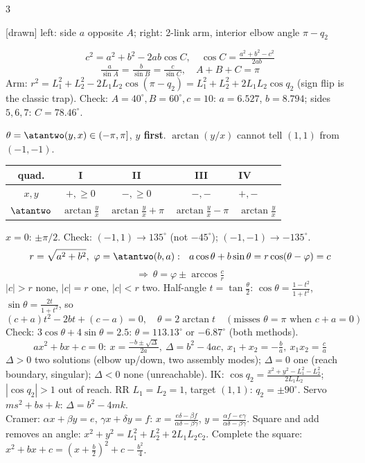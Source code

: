 \begin{multicols}{3}
\begin{fbx}
\par
{\sffamily\scriptsize\color{slate}[drawn] left: side $a$ opposite $A$; right: 2-link arm, interior elbow angle $\pi-q_2$}\par
\raggedright
\[c^2=a^2+b^2-2ab\cos C,\quad\cos C=\tfrac{a^2+b^2-c^2}{2ab}\]
\[\tfrac a{\sin A}=\tfrac b{\sin B}=\tfrac c{\sin C},\quad A+B+C=\pi\]
Arm: $r^2=L_1^2+L_2^2-2L_1L_2\cos(\pi-q_2)=L_1^2+L_2^2+2L_1L_2\cos q_2$ (sign flip is the classic trap). Check: $A=40^\circ,B=60^\circ,c=10$: $a=6.527$, $b=8.794$; sides $5,6,7$: $C=78.46^\circ$. \chk
\end{fbx}
\begin{fbx}[$\atantwo$; $a\cos\theta+b\sin\theta=c$; half-angle; quadratic]
$\theta=\atantwo(y,x)\in(-\pi,\pi]$, \textbf{$y$ first}. $\arctan(y/x)$ cannot tell $(1,1)$ from $(-1,-1)$.
\begin{tabularx}{\linewidth}{@{}ccccX@{}}\toprule
quad. & I & II & III & IV\\\midrule
$x,y$ & $+,\ge0$ & $-,\ge0$ & $-,-$ & $+,-$\\
$\atantwo$ & $\arctan\frac yx$ & $\arctan\frac yx+\pi$ & $\arctan\frac yx-\pi$ & $\arctan\frac yx$\\\bottomrule
\end{tabularx}
$x=0$: $\pm\pi/2$. Check: $(-1,1)\to135^\circ$ (not $-45^\circ$); $(-1,-1)\to-135^\circ$. \chk
\[r=\sqrt{a^2+b^2},\ \varphi=\atantwo(b,a):\ \ a\cos\theta+b\sin\theta=r\cos(\theta-\varphi)=c\]
\[\Rightarrow\ \theta=\varphi\pm\arccos\tfrac cr\]
$|c|>r$ none, $|c|=r$ one, $|c|<r$ two. Half-angle $t=\tan\frac\theta2$: $\cos\theta=\frac{1-t^2}{1+t^2}$, $\sin\theta=\frac{2t}{1+t^2}$, so
\[(c+a)t^2-2bt+(c-a)=0,\quad\theta=2\arctan t\quad(\text{misses }\theta=\pi\text{ when }c+a=0)\]
Check: $3\cos\theta+4\sin\theta=2.5$: $\theta=113.13^\circ$ or $-6.87^\circ$ (both methods). \chk
\[ax^2+bx+c=0:\ x=\tfrac{-b\pm\sqrt\Delta}{2a},\ \Delta=b^2-4ac,\ x_1+x_2=-\tfrac ba,\ x_1x_2=\tfrac ca\]
$\Delta>0$ two solutions (elbow up/down, two assembly modes); $\Delta=0$ one (reach boundary, singular); $\Delta<0$ none (unreachable). IK: $\cos q_2=\frac{x^2+y^2-L_1^2-L_2^2}{2L_1L_2}$; $|\cos q_2|>1$ out of reach. RR $L_1=L_2=1$, target $(1,1)$: $q_2=\pm90^\circ$. Servo $ms^2+bs+k$: $\Delta=b^2-4mk$.\\
Cramer: $\alpha x+\beta y=e$, $\gamma x+\delta y=f$: $x=\frac{e\delta-\beta f}{\alpha\delta-\beta\gamma}$, $y=\frac{\alpha f-e\gamma}{\alpha\delta-\beta\gamma}$. Square and add removes an angle: $x^2+y^2=L_1^2+L_2^2+2L_1L_2c_2$. Complete the square: $x^2+bx+c=(x+\frac b2)^2+c-\frac{b^2}4$. \chk
\end{fbx}


\end{multicols}
